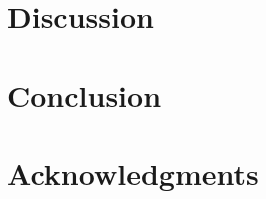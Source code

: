 \documentclass[journal]{IEEEtran}
\begin{document}
\section{Discussion}
\label{sec:discussion}


\section{Conclusion}
\label{sec:conclusion}


\section*{Acknowledgments}


\ifCLASSOPTIONcaptionsoff
  \newpage
\fi

%






\end{document}
